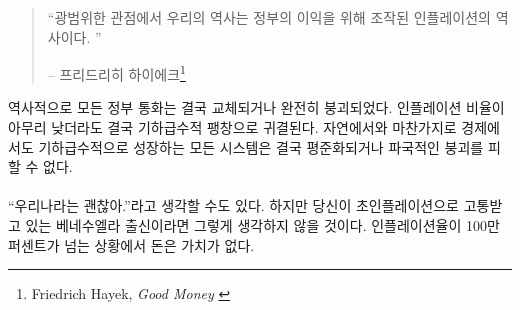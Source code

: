 \begin{quotation}\begin{samepage}
\enquote{광범위한 관점에서 우리의 역사는 정부의 이익을 위해 조작된 인플레이션의 역사이다. }
\begin{flushright} -- 프리드리히 하이에크\footnote{Friedrich Hayek, \textit{Good Money} \cite{hayek-good-money}}
\end{flushright}\end{samepage}\end{quotation}

역사적으로 모든 정부 통화는 결국 교체되거나 완전히 붕괴되었다. 
인플레이션 비율이 아무리 낮더라도 결국 기하급수적 팽창으로 귀결된다. 
자연에서와 마찬가지로 경제에서도 기하급수적으로 성장하는 
모든 시스템은 결국 평준화되거나 파국적인 붕괴를 피할 수 없다.

\paragraph{}
\enquote{우리나라는 괜찮아.}라고 생각할 수도 있다.
하지만 당신이 초인플레이션으로 고통받고 있는 베네수엘라 출신이라면 그렇게 생각하지 않을 것이다. 
인플레이션율이 100만 퍼센트가 넘는 상황에서 돈은 가치가 없다.\cite{wiki:venezuela}

